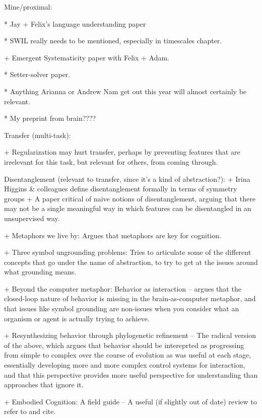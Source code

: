 Mine/proximal:

* Jay + Felix's language understanding paper

* SWIL really needs to be mentioned, especially in timescales chapter.

+ Emergent Systematicity paper with Felix + Adam.

* Setter-solver paper.

* Anything Arianna or Andrew Nam get out this year will almost certainly be relevant.

* My preprint from brain????


Transfer (multi-task):

+ Regularization may hurt transfer, perhaps by preventing features that are irrelevant for this task, but relevant for others, from coming through. \citep{Kornblith2019} 

    Disentanglement (relevant to transfer, since it's a kind of abstraction?):
        + Irina Higgins & colleagues define disentanglement formally in terms of symmetry groups \citep{Higgins2018}
        + A paper critical of naive notions of disentanglement, arguing that there may not be a single meaningful way in which features can be disentangled in an unsupervised way. \citep{Locatello2019}

+ Metaphors we live by: Argues that metaphors are key for cognition. \citep{Lakoff2008} 

+ Three symbol ungrounding problems: Tries to articulate some of the different concepts that go under the name of abstraction, to try to get at the issues around what grounding means. \citep{Dove2016}

+ Beyond the computer metaphor: Behavior as interaction -- argues that the closed-loop nature of behavior is missing in the brain-as-computer metaphor, and that issues like symbol grounding are non-issues when you consider what an organism or agent is actually trying to achieve. \citep{Cisek1999}

+ Resynthesizing behavior through phylogenetic refinement -- The radical version of the above, which argues that behavior should be intereprted as progressing from simple to complex over the course of evolution as was useful at each stage, essentially developing more and more complex control systems for interaction, and that this perspective provides more useful perspective for understanding than approaches that ignore it. \citep{Cisek2019}

+ Embodied Cognition: A field guide -- A useful (if slightly out of date) review to refer to and cite. \citep{Anderson2003}

